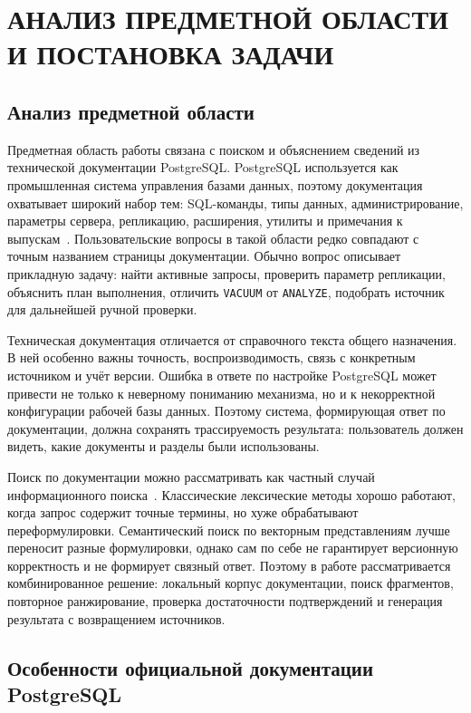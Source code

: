 \chapter{{\fontsize{14pt}{21pt}\selectfont\MakeUppercase{Анализ предметной области и постановка задачи}}}
\label{cha:analysis}

\section{Анализ предметной области}

Предметная область работы связана с поиском и объяснением сведений из технической документации PostgreSQL. PostgreSQL используется как промышленная система управления базами данных, поэтому документация охватывает широкий набор тем: SQL-команды, типы данных, администрирование, параметры сервера, репликацию, расширения, утилиты и примечания к выпускам~\cite{postgres-docs,date2004,garcia2008,silberschatz2020}. Пользовательские вопросы в такой области редко совпадают с точным названием страницы документации. Обычно вопрос описывает прикладную задачу: найти активные запросы, проверить параметр репликации, объяснить план выполнения, отличить \texttt{VACUUM} от \texttt{ANALYZE}, подобрать источник для дальнейшей ручной проверки.

Техническая документация отличается от справочного текста общего назначения. В ней особенно важны точность, воспроизводимость, связь с конкретным источником и учёт версии. Ошибка в ответе по настройке PostgreSQL может привести не только к неверному пониманию механизма, но и к некорректной конфигурации рабочей базы данных. Поэтому система, формирующая ответ по документации, должна сохранять трассируемость результата: пользователь должен видеть, какие документы и разделы были использованы.

Поиск по документации можно рассматривать как частный случай информационного поиска~\cite{manning2008}. Классические лексические методы хорошо работают, когда запрос содержит точные термины, но хуже обрабатывают переформулировки. Семантический поиск по векторным представлениям лучше переносит разные формулировки, однако сам по себе не гарантирует версионную корректность и не формирует связный ответ. Поэтому в работе рассматривается комбинированное решение: локальный корпус документации, поиск фрагментов, повторное ранжирование, проверка достаточности подтверждений и генерация результата с возвращением источников.

\section{Особенности официальной документации PostgreSQL}


